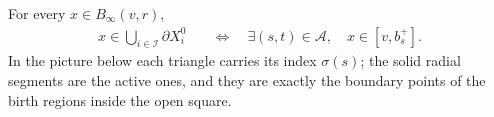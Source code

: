 \begin{lemma}
    \label{thm:area_law_initial_active_radial}
    \leanok
    For every $x\in B_\infty(v,r)$,
    \begin{align}
        x\in\bigcup_{i\in\mathcal I}\partial X_i^0
         & \quad\Longleftrightarrow\quad
        \exists(s,t)\in\mathcal A,\quad x\in[v,b_s^+].
    \end{align}
    In the picture below each triangle carries its index $\sigma(s)$;
    the solid radial segments are the active ones, and they are exactly the
    boundary points of the birth regions inside the open square.
    
\end{lemma}
